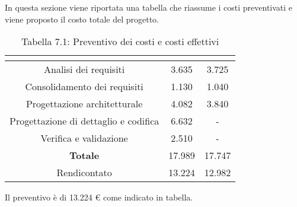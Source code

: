 In questa sezione viene riportata una tabella che riassume i costi preventivati e viene proposto il costo totale del progetto.
\\
\renewcommand{\arraystretch}{1.5}
\begin{table}[H]
\begin{center}
\begin{tabular}{|c|c|c|}
\hline
\rowcolor{title_row}
\textbf{\color{title_text}{Periodo}}  & \textbf{\color{title_text}{Preventivo \euro}} & \textbf{\color{title_text}{Consuntivo \euro}} \\ \hline
Analisi dei requisiti   & 3.635 & 3.725 \\ \hline
Consolidamento dei requisiti   & 1.130 & 1.040 \\ \hline
Progettazione architetturale    & 4.082 & 3.840 \\ \hline
Progettazione di dettaglio e codifica    & 6.632 & - \\ \hline
Verifica e validazione    & 2.510 & - \\ \hline
\textbf{Totale}   & 17.989 & 17.747 \\ \hline
Rendicontato   & 13.224 & 12.982 \\ \hline
\end{tabular}
\caption{Tabella 7.1: Preventivo dei costi e costi effettivi\label{}}
\end{center}
\end{table}
\renewcommand{\arraystretch}{1}

Il preventivo è di 13.224 \euro{} come indicato in tabella.
\newpage
